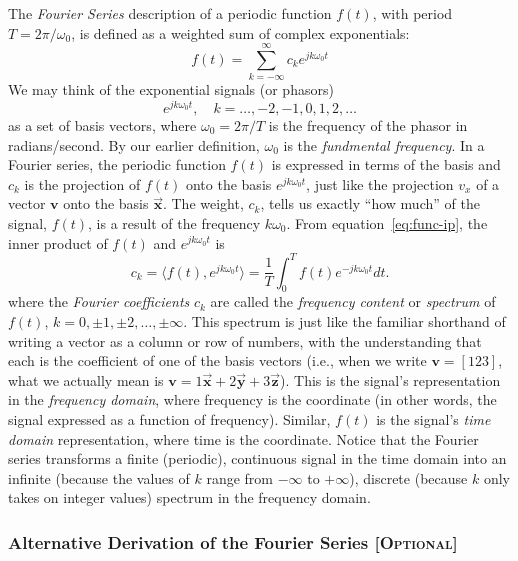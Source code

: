 The \emph{Fourier Series} description of a periodic function $f(t)$, 
with period $T=2\pi/\omega_0$, is defined
as a weighted sum of complex exponentials:
\begin{equation}
f(t) = \sum_{k=-\infty}^{\infty} c_k e^{jk\omega_0 t}
\label{eq:fs}
\end{equation}
We may think of the exponential signals (or phasors)
\begin{equation}
e^{jk\omega_0 t}, \quad k = \ldots, -2, -1, 0, 1, 2, \ldots
\end{equation}
as a set of basis vectors, where $\omega_0 = 2\pi /T$ is the frequency of
the phasor in radians/second. By our earlier definition, $\omega_0$ is the
\emph{fundmental frequency}. In a Fourier series, the periodic
function $f(t)$ is expressed in terms of the basis and $c_k$ is the
projection of $f(t)$ onto the basis $e^{jk\omega_0 t}$, just like the
projection $v_x$ of a vector $\mathbf{v}$ onto the basis $\vec{\mathbf{x}}$. The weight, $c_k$, tells us exactly ``how much'' of the signal, $f(t)$, is a result of the frequency $k\omega_0$. From
equation~\ref{eq:func-ip}, the inner product of $f(t)$ and
$e^{jk\omega_0 t}$ is
\begin{equation}
c_k = \langle f(t), e^{jk\omega_0 t}\rangle 
    = \frac{1}{T}\int_0^T f(t)e^{-jk\omega_0 t}dt.
\label{eq:fs-ck}
\end{equation}
where the \emph{Fourier coefficients} $c_k$ are called the
 \emph{frequency content} or
\emph{spectrum} of $f(t)$, $k=0, \pm 1, \pm 2, \ldots,
\pm\infty$. This spectrum is just like the familiar shorthand of
writing a vector as a column or row of numbers, with the understanding
that each is the coefficient of one of the basis vectors (i.e., when
we write $\mathbf{v} = [1 2 3]$, what we actually mean is $\mathbf{v}
= 1 \vec{\mathbf{x}} + 2 \vec{\mathbf{y}} + 3 \vec{\mathbf{z}}$).
This is the signal's representation in the \emph{frequency domain},
where frequency is the coordinate (in other words, the signal
expressed as a function of frequency).  Similar, $f(t)$ is the
signal's \emph{time domain} representation, where time is the
coordinate. Notice that the Fourier series transforms a finite
(periodic), continuous signal in the time domain into an infinite
(because the values of $k$ range from $-\infty$ to $+\infty$),
discrete (because $k$ only takes on integer values) spectrum in the
frequency domain.

\subsubsection{Alternative Derivation of the Fourier Series [\textsc{Optional}]}

